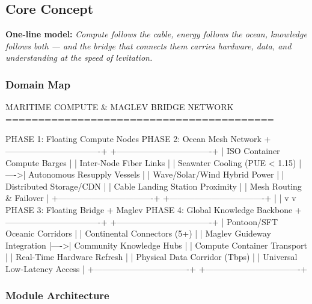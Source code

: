 \documentclass[11pt,letterpaper]{article}
\begin{document}
\subsection{Core Concept}

\textbf{One-line model:} \textit{Compute follows the cable, energy follows the ocean, knowledge follows both --- and the bridge that connects them carries hardware, data, and understanding at the speed of levitation.}

\subsubsection{Domain Map}

\begin{asciibox}
                    MARITIME COMPUTE & MAGLEV BRIDGE NETWORK
                    =========================================

  PHASE 1: Floating Compute Nodes          PHASE 2: Ocean Mesh Network
  +----------------------------------+     +----------------------------------+
  | ISO Container Compute Barges     |     | Inter-Node Fiber Links           |
  | Seawater Cooling (PUE < 1.15)    |---->| Autonomous Resupply Vessels      |
  | Wave/Solar/Wind Hybrid Power     |     | Distributed Storage/CDN          |
  | Cable Landing Station Proximity  |     | Mesh Routing & Failover          |
  +----------------------------------+     +----------------------------------+
              |                                          |
              v                                          v
  PHASE 3: Floating Bridge + Maglev    PHASE 4: Global Knowledge Backbone
  +----------------------------------+     +----------------------------------+
  | Pontoon/SFT Oceanic Corridors    |     | Continental Connectors (5+)      |
  | Maglev Guideway Integration      |---->| Community Knowledge Hubs         |
  | Compute Container Transport      |     | Real-Time Hardware Refresh       |
  | Physical Data Corridor (Tbps)    |     | Universal Low-Latency Access     |
  +----------------------------------+     +----------------------------------+
\end{asciibox}

\subsubsection{Module Architecture}
\end{document}
